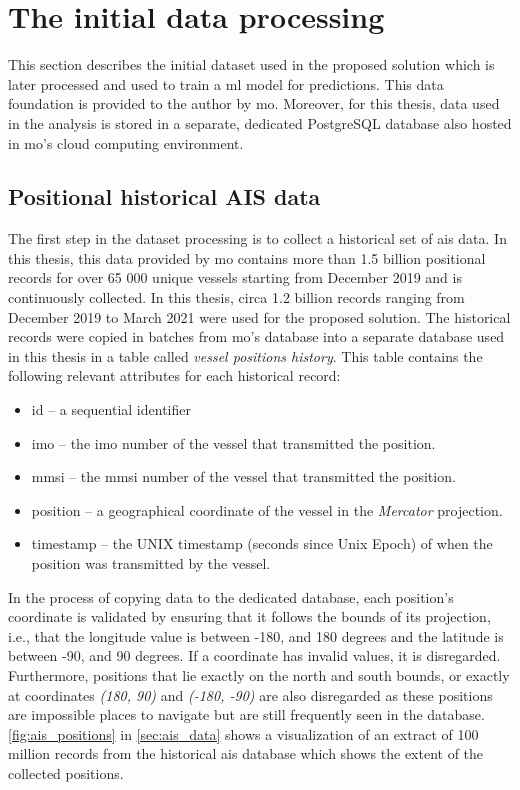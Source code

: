\section{The initial data processing}

This section describes the initial dataset used in the proposed solution which is later processed and used to train a \acrshort{ml} model for predictions. This data foundation is provided to the author by \acrfull{mo}. Moreover, for this thesis, data used in the analysis is stored in a separate, dedicated PostgreSQL database also hosted in \acrshort{mo}'s cloud computing environment.

\subsection{Positional historical AIS data}

The first step in the dataset processing is to collect a historical set of \acrshort{ais} data. In this thesis, this data provided by \acrshort{mo} contains more than 1.5 billion positional records for over 65 000 unique vessels starting from December 2019 and is continuously collected. In this thesis, circa 1.2 billion records ranging from December 2019 to March 2021 were used for the proposed solution. The historical records were copied in batches from \acrshort{mo}'s database into a separate database used in this thesis in a table called \textit{vessel positions history}. This table contains the following relevant attributes for each historical record:

\begin{itemize}
    \item id -- a sequential identifier
    \item imo -- the \acrshort{imo} number of the vessel that transmitted the position.
    \item mmsi -- the \acrshort{mmsi} number of the vessel that transmitted the position.
    \item position -- a geographical coordinate of the vessel in the \textit{Mercator} projection.
    \item timestamp -- the UNIX timestamp (seconds since Unix Epoch) of when the position was transmitted by the vessel.
\end{itemize}

In the process of copying data to the dedicated database, each position's coordinate is validated by ensuring that it follows the bounds of its projection, i.e., that the longitude value is between -180, and 180 degrees and the latitude is between -90, and 90 degrees. If a coordinate has invalid values, it is disregarded. Furthermore, positions that lie exactly on the north and south bounds, or exactly at coordinates \textit{(180, 90)} and \textit{(-180, -90)} are also disregarded as these positions are impossible places to navigate but are still frequently seen in the database. \cref{fig:ais_positions} in \cref{sec:ais_data} shows a visualization of an extract of 100 million records from the historical \acrshort{ais} database which shows the extent of the collected positions.

